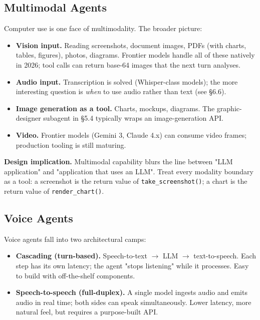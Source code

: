 \documentclass[a4paper,11pt]{article}
\begin{document}
\subsection{Multimodal Agents}

Computer use is one face of multimodality. The broader picture:

\begin{itemize}[noitemsep, leftmargin=1.2em]
  \item \textbf{Vision input.} Reading screenshots, document images,
        PDFs (with charts, tables, figures), photos, diagrams.
        Frontier models handle all of these natively in 2026; tool
        calls can return base-64 images that the next turn analyses.
  \item \textbf{Audio input.} Transcription is solved
        (Whisper-class models); the more interesting question is
        \emph{when} to use audio rather than text (see §6.6).
  \item \textbf{Image generation as a tool.} Charts, mockups,
        diagrams. The graphic-designer subagent in §5.4 typically
        wraps an image-generation API.
  \item \textbf{Video.} Frontier models (Gemini 3, Claude 4.x) can
        consume video frames; production tooling is still maturing.
\end{itemize}

\textbf{Design implication.} Multimodal capability blurs the line
between "LLM application" and "application that uses an LLM".
Treat every modality boundary as a tool: a screenshot is the return
value of \texttt{take\_screenshot()}; a chart is the return value of
\texttt{render\_chart()}.

\subsection{Voice Agents}

Voice agents fall into two architectural camps:

\begin{itemize}[noitemsep, leftmargin=1.2em]
  \item \textbf{Cascading (turn-based).} Speech-to-text $\to$ LLM
        $\to$ text-to-speech. Each step has its own latency; the
        agent "stops listening" while it processes. Easy to build
        with off-the-shelf components.
  \item \textbf{Speech-to-speech (full-duplex).} A single model
        ingests audio and emits audio in real time; both sides can
        speak simultaneously. Lower latency, more natural feel, but
        requires a purpose-built API.
\end{itemize}
\end{document}
